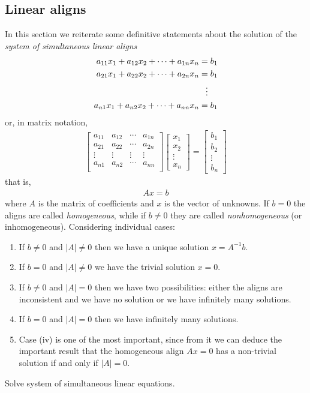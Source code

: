 \documentclass[12pt,a4paper,fleqn]{mycalc}
\begin{document}
	\subsection{Linear aligns}
	In this section we reiterate some definitive statements about the solution of the \emph{system of simultaneous linear aligns}
	\begin{align*}
	a_{11}x_1+a_{12}x_2+\cdots+a_{1n}x_n &=b_1\\
	a_{21}x_1+a_{22}x_2+\cdots+a_{2n}x_n &=b_1\\
	&\hphantom{=} \vdots\\
	a_{n1}x_1+a_{n2}x_2+\cdots+a_{nn}x_n &=b_1
	\end{align*}
	or, in matrix notation,
	\begin{align*}
	\begin{bmatrix}
	a_{11} & a_{12} & \cdots & a_{1n}\\
	a_{21} & a_{22} & \cdots & a_{2n}\\
	\vdots & \vdots & \vdots & \vdots\\
	a_{n1} & a_{n2} & \cdots & a_{nn}\\
	\end{bmatrix}
	\begin{bmatrix}
	x_1\\
	x_2\\
	\vdots\\
	x_n
	\end{bmatrix}
	=
	\begin{bmatrix}
	b_1\\
	b_2\\
	\vdots\\
	b_n
	\end{bmatrix}
	\end{align*}
	that is,
	\begin{align*}
	Ax=b
	\end{align*}
	where $ A $ is the matrix of coefficients and $ x $ is the vector of unknowns. If $ b = 0 $ the aligns are called \emph{homogeneous}, while if $ b \neq 0 $ they are called \emph{nonhomogeneous} (or
	inhomogeneous). Considering individual cases:
	\begin{enumerate}[label={\protect\color{mycalc}Case~(\roman*)}]
		\item If $ b \neq 0 $ and $ |A | \neq 0 $ then we have a unique solution $ x = A^{-1}b. $
		\item If $ b = 0 $ and $ |A | \neq 0 $ we have the trivial solution $ x = 0. $
		\item If $ b \neq 0 $ and $ |A | = 0 $ then we have two possibilities: either the aligns are inconsistent
		and we have no solution or we have infinitely many solutions.
		\item If $ b = 0 $ and $ |A | = 0 $ then we have infinitely many solutions.
		\item[] Case (iv) is one of the most important, since from it we can deduce the important result that the homogeneous align $ Ax = 0 $ has a non-trivial solution if and only if $ |A | = 0. $
	\end{enumerate}
	\begin{tcolorbox}[title={Matlab Practice}]
		Solve system of simultaneous linear equations.
	\end{tcolorbox}
\end{document}

